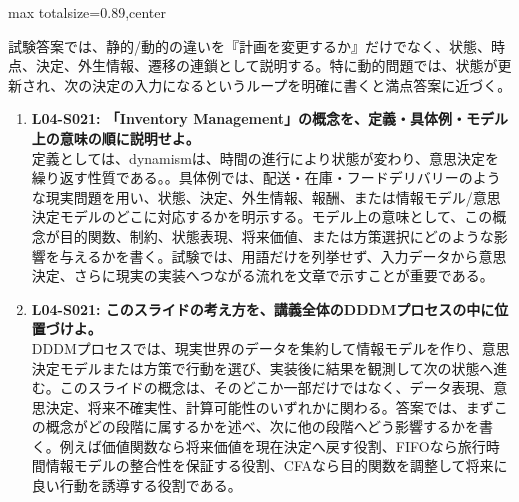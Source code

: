 \begin{minipage}[t]{0.58\textwidth}
\begin{adjustbox}{max totalsize={\textwidth}{0.89\textheight},center}
\begin{minipage}{\textwidth}
試験答案では、静的/動的の違いを『計画を変更するか』だけでなく、状態、時点、決定、外生情報、遷移の連鎖として説明する。特に動的問題では、状態が更新され、次の決定の入力になるというループを明確に書くと満点答案に近づく。\par{}\begin{enumerate}\item \textbf{L04-S021: 「Inventory Management」の概念を、定義・具体例・モデル上の意味の順に説明せよ。}\\定義としては、dynamismは、時間の進行により状態が変わり、意思決定を繰り返す性質である。。具体例では、配送・在庫・フードデリバリーのような現実問題を用い、状態、決定、外生情報、報酬、または情報モデル/意思決定モデルのどこに対応するかを明示する。モデル上の意味として、この概念が目的関数、制約、状態表現、将来価値、または方策選択にどのような影響を与えるかを書く。試験では、用語だけを列挙せず、入力データから意思決定、さらに現実の実装へつながる流れを文章で示すことが重要である。\item \textbf{L04-S021: このスライドの考え方を、講義全体のDDDMプロセスの中に位置づけよ。}\\DDDMプロセスでは、現実世界のデータを集約して情報モデルを作り、意思決定モデルまたは方策で行動を選び、実装後に結果を観測して次の状態へ進む。このスライドの概念は、そのどこか一部だけではなく、データ表現、意思決定、将来不確実性、計算可能性のいずれかに関わる。答案では、まずこの概念がどの段階に属するかを述べ、次に他の段階へどう影響するかを書く。例えば価値関数なら将来価値を現在決定へ戻す役割、FIFOなら旅行時間情報モデルの整合性を保証する役割、CFAなら目的関数を調整して将来に良い行動を誘導する役割である。\end{enumerate}
\end{minipage}
\end{adjustbox}
\end{minipage}


